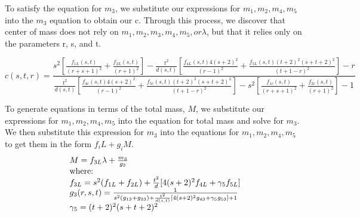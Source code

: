 \documentclass[11pt,leqno]{article}
\theoremstyle{definition}
\theoremstyle{remark}
\numberwithin{equation}{section}
\begin{document}
To satisfy the equation for $m_3$, we substitute our expressions for $m_1,m_2,m_4,m_5$ into the $m_3$ equation to obtain our c. Through this process, we discover that center of mass does not rely on $m_1, m_2, m_3, m_4, m_5, or \lambda$, but that it relies only on the parameters r, s, and t.

\begin{equation}
c(s,t,r)=\frac{s^{2}[\frac{f_{1L}(s,t)}{(r+s+1)^{2}}+\frac{f_{2L}(s,t)}{(r+1)^{2}}]-\frac{t^{2}}{d(s,t)}[\frac{f_{4L}(s,t)4(s+2)^{2}}{(r-1)^{2}}+\frac{f_{5L}(s,t)(t+2)^{2}(s+t+2)^{2}}{(t+1-r)^{2}}]-r}{\frac{t^{2}}{d(s,t)}[\frac{f_{4c}(s,t)4(s+2)^{2}}{(r-1)^{2}}+\frac{f_{5c}(s,t)(t+2)^{2}(s+t+2)^{2}}{(t+1-r)^{2}}]-s^{2}[\frac{f_{1c}(s,t)}{(r+s+1)^{2}}+\frac{f_{2c}(s,t)}{(r+1)^{2}}]-1}
\end{equation}

 \hspace{3cm}
 
 To generate equations in terms of the total mass, $M$, we substitute our expressions for $m_1,m_2,m_4,m_5$ into the equation for total mass and solve for $m_3$. We then substitute this expression for $m_3$ into the equations for $m_1,m_2,m_4,m_5$ to get them in the form $f_iL+g_iM$.
\begin{equation}\begin{array}{l}
M=f_{3L}\lambda+\frac{m_{3}}{g_{3}} \\
$where:$\\ 
f_{3L}=s^{2}(f_{1L}+f_{2L})+\frac{t^{2}}{d}[4(s+2)^{2}f_{4L}+\gamma_{5}f_{5L}] \\
g_{3}(r,s,t)=\frac{1}{s^{2}(g_{13}+g_{23})+\frac{t^{2}}{d(s,t)}[4(s+2)^{2}g_{43}+\gamma_{5}g_{53}]+1} \\
\gamma_{5}=(t+2)^{2}(s+t+2)^{2}
\end{array}
\end{equation} 
\end{document}
